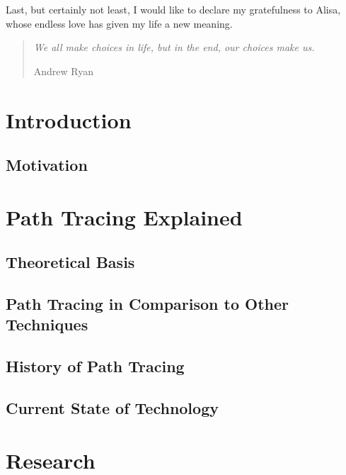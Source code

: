 \documentclass[
  twoside,
  11pt, a4paper,
  footinclude=true,
  headinclude=true,
  cleardoublepage=empty
]{scrreprt}
\begin{document}
Last, but certainly not least, I would like to declare my gratefulness to Alisa, whose endless love
has given my life a new meaning.

\singlespace

\clearpage
\vspace*{\fill}
\thispagestyle{empty} %
\begin{quotation}
    \em
    We all make choices in life, but in the end, our choices make us.

    \medskip
    \raggedleft
    Andrew Ryan
\end{quotation}
\vspace*{\fill}

\tableofcontents

\chapter{Introduction}
\lipsum[1]

\section{Motivation}
\lipsum[1]

\chapter{Path Tracing Explained}
\lipsum[1]

\section{Theoretical Basis}
\lipsum[1]

\section{Path Tracing in Comparison to Other Techniques}
\lipsum[1]

\section{History of Path Tracing}
\lipsum[1]

\section{Current State of Technology}
\lipsum[1]

\chapter{Research}
\lipsum[1]
\end{document}
